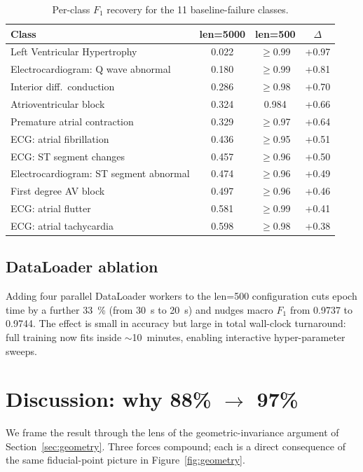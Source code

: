 \documentclass[conference]{IEEEtran}
\begin{document}
\begin{table}[t]
\caption{Per-class $F_1$ recovery for the 11 baseline-failure classes.}
\label{tab:perclass}
\centering
\small
\begin{tabular}{@{}lccc@{}}
\toprule
Class & len=5000 & len=500 & $\Delta$ \\
\midrule
Left Ventricular Hypertrophy           & 0.022 & $\geq$0.99 & +0.97 \\
Electrocardiogram: Q wave abnormal     & 0.180 & $\geq$0.99 & +0.81 \\
Interior diff.~conduction              & 0.286 & $\geq$0.98 & +0.70 \\
Atrioventricular block                 & 0.324 & 0.984      & +0.66 \\
Premature atrial contraction           & 0.329 & $\geq$0.97 & +0.64 \\
ECG: atrial fibrillation               & 0.436 & $\geq$0.95 & +0.51 \\
ECG: ST segment changes                & 0.457 & $\geq$0.96 & +0.50 \\
Electrocardiogram: ST segment abnormal & 0.474 & $\geq$0.96 & +0.49 \\
First degree AV block                  & 0.497 & $\geq$0.96 & +0.46 \\
ECG: atrial flutter                    & 0.581 & $\geq$0.99 & +0.41 \\
ECG: atrial tachycardia                & 0.598 & $\geq$0.98 & +0.38 \\
\bottomrule
\end{tabular}
\end{table}

\subsection{DataLoader ablation}
Adding four parallel DataLoader workers to the len=500 configuration cuts
epoch time by a further \SI{33}{\percent} (from \SI{30}{\second} to
\SI{20}{\second}) and nudges macro $F_1$ from \num{0.9737} to \num{0.9744}.
The effect is small in accuracy but large in total wall-clock
turnaround: full training now fits inside $\sim$10~minutes, enabling
interactive hyper-parameter sweeps.

\section{Discussion: why 88\% $\rightarrow$ 97\%}
\label{sec:discussion}
We frame the result through the lens of the geometric-invariance argument
of Section~\ref{sec:geometry}. Three forces compound; each is a direct
consequence of the same fiducial-point picture in
Figure~\ref{fig:geometry}.
\end{document}
